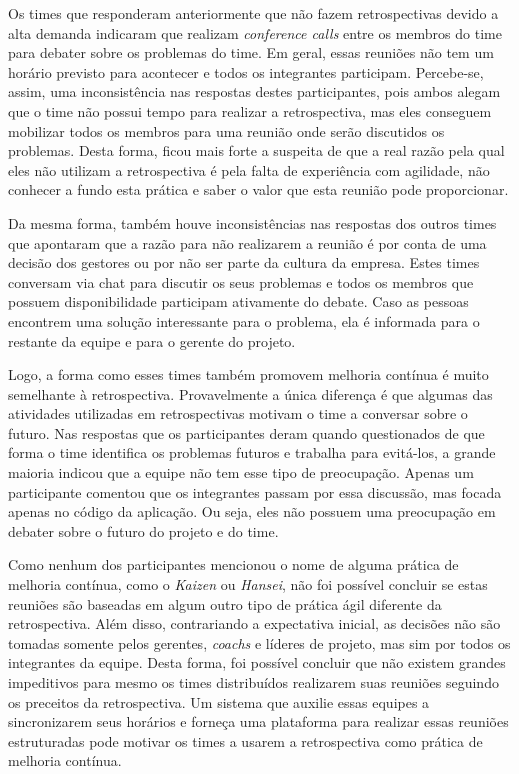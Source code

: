 Os times que responderam anteriormente que não fazem retrospectivas devido a alta demanda indicaram que realizam \textit{conference calls} entre os membros do time para debater sobre os problemas do time. Em geral, essas reuniões não tem um horário previsto para acontecer e todos os integrantes participam. Percebe-se, assim, uma inconsistência nas respostas destes participantes, pois ambos alegam que o time não possui tempo para realizar a retrospectiva, mas eles conseguem mobilizar todos os membros para uma reunião onde serão discutidos os problemas. Desta forma, ficou mais forte a suspeita de que a real razão pela qual eles não utilizam a retrospectiva é pela falta de experiência com agilidade, não conhecer a fundo esta prática e saber o valor que esta reunião pode proporcionar.

Da mesma forma, também houve inconsistências nas respostas dos outros times que apontaram que a razão para não realizarem a reunião é por conta de uma decisão dos gestores ou por não ser parte da cultura da empresa. Estes times conversam via chat para discutir os seus problemas e todos os membros que possuem disponibilidade participam ativamente do debate. Caso as pessoas encontrem uma solução interessante para o problema, ela é informada para o restante da equipe e para o gerente do projeto. 

Logo, a forma como esses times também promovem melhoria contínua é muito semelhante à retrospectiva. Provavelmente a única diferença é que algumas das atividades utilizadas em retrospectivas motivam o time a conversar sobre o futuro. Nas respostas que os participantes deram quando questionados de que forma o time identifica os problemas futuros e trabalha para evitá-los, a grande maioria indicou que a equipe não tem esse tipo de preocupação. Apenas um participante comentou que os integrantes passam por essa discussão, mas focada apenas no código da aplicação. Ou seja, eles não possuem uma preocupação em debater sobre o futuro do projeto e do time.

Como nenhum dos participantes mencionou o nome de alguma prática de melhoria contínua, como o \textit{Kaizen} ou \textit{Hansei}, não foi possível concluir se estas reuniões são baseadas em algum outro tipo de prática ágil diferente da retrospectiva. Além disso, contrariando a expectativa inicial, as decisões não são tomadas somente pelos gerentes, \textit{coachs} e líderes de projeto, mas sim por todos os integrantes da equipe. Desta forma, foi possível concluir que não existem grandes impeditivos para mesmo os times distribuídos realizarem suas reuniões seguindo os preceitos da retrospectiva. Um sistema que auxilie essas equipes a sincronizarem seus horários e forneça uma plataforma para realizar essas reuniões estruturadas pode motivar os times a usarem a retrospectiva como prática de melhoria contínua.

